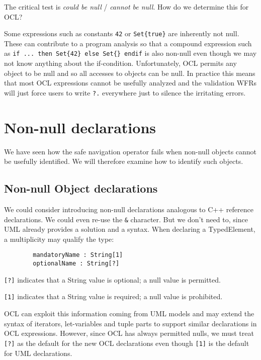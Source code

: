 \documentclass{llncs}
\begin{document}
The critical test is \emph{could be null} / \emph{cannot be null}. How do we determine this for OCL?

Some expressions such as constants \verb|42| or \verb|Set{true}| are inherently not null. These can contribute to a program analysis so that a compound expression such as \verb|if ... then Set{42} else Set{} endif| is also non-null even though we may not know anything about the if-condition. Unfortunately, OCL permits any object to be null and so all accesses to objects can be null. In practice this means that most OCL expressions cannot be usefully analyzed and the validation WFRs will just force users to write \verb|?.| everywhere just to silence the irritating errors. 

\section{Non-null declarations}\label{Non-null declarations}

We have seen how the safe navigation operator fails when non-null objects cannot be usefully identified. We will therefore examine how to identify such objects. 

\subsection{Non-null Object declarations}

We could consider introducing non-null declarations analogous to C++ reference declarations. We could even re-use the \verb|&| character. But we don't need to, since UML already provides a solution and a syntax. When declaring a TypedElement, a multiplicity may qualify the type:

\begin{verbatim}
        mandatoryName : String[1]
        optionalName : String[?]
\end{verbatim}

\verb|[?]| indicates that a String value is optional; a null value is permitted.

\verb|[1]| indicates that a String value is required; a null value is prohibited.

OCL can exploit this information coming from UML models and may extend the syntax of iterators, let-variables and tuple parts to support similar declarations in OCL expressions. However, since OCL has always permitted nulls, we must treat \verb|[?]| as the default for the new OCL declarations even though \verb|[1]| is the default for UML declarations.
\end{document}
